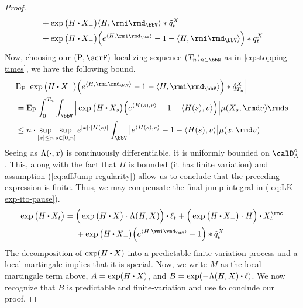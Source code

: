 \begin{proof}
\begin{align}
\begin{aligned}[t]
      &+ \exp\big( H \shortInt \X_- \big) \prj{H}{\id_\vecSpace} \ast \compensate{\jumpMeas^\X}_t \\
      &+ \exp\big(H\shortInt\X_-\big) \Big( e^{\prj{H}{\id_\vecSpace}} - 1 - \prj{H}{\id_\vecSpace} \Big) \ast \jumpMeas^\X_t
    \end{aligned} 
  \end{align}
  Now, choosing our $(\Prb, \scrF)$ localizing sequence $(T_n)_{n\in\bbN}$ as in \ref{eq:stopping-times}, we have the following bound.
  \begin{align*}
    &\Exp_\Prb \Big| \exp\big(H \shortInt \X_- \big) \Big(e^\prj{H}{\id_\vecSpace} - 1 - \prj{H}{\id_\vecSpace} \Big) \ast \predproj{\jumpMeas^\X}_{T_n} \Big| \\
    &= \Exp_\Prb \int_0^{T_n} \int_\vecSpace \Big| \exp\big(H \shortInt \X_s \big) \Big( e^\prj{H(s)}{\markVar} - 1 - \prj{H(s)}{\markVar} \Big) \Big| \affJump(\X_s, \rmd\markVar) \rmd s \\
    &\leq n \cdot \sup_{|\stateVar| \leq n} \sup_{s \in [0,n]} e^{|\stateVar|\cdot|H(s)|} \int_\vecSpace \big| e^\prj{H(s)}{\markVar} - 1 - \prj{H(s)}{\markVar} \big| \affJump(\stateVar, \rmd\markVar) 
  \end{align*}
  Seeing as $\Lambda(\cdot, x)$ is continuously differentiable, it is uniformly bounded on $\odeSpace^\circ$.
  This, along with the fact that $H$ is bounded (it has finite variation) and assumption (\ref{eq:affJump-regularity}) allow us to conclude that the preceding expression is finite.
  Thus, we may compensate the final jump integral in (\ref{eq:LK-exp-ito-pause}).
  \begin{equation}
    \label{eq:jump-diffusion-exponentially-special}
    \exp\big( H \shortInt \X_t \big) 
    = \begin{aligned}[t]
      &\Big(\exp\big( H \shortInt \X \big) \cdot \ode(H, \X) \Big) \shortInt \leb_t + \Big( \exp\big( H \shortInt \X_- \big) \cdot H \Big) \shortInt \X^\rmc_t \\
      &+ \exp\big(H\shortInt\X_-\big) \Big( e^{\prj{H}{\id_\vecSpace}} - 1 \Big) \ast \compensate{\jumpMeas^\X}_t
    \end{aligned} 
  \end{equation}
  The decomposition of $\exp(H \shortInt \X)$ into a predictable finite-variation process and a  local martingale implies that it is special.
  Now, we write $M$ as the local martingale term above, $A = \exp(H \shortInt \X)$, and $B = \exp(-\ode(H, \X) \shortInt \leb)$.
  We now recognize that $B$ is predictable and finite-variation and use \cite[Proposition I.4.49(b)]{jacod2003} to conclude our proof.

\end{proof}
